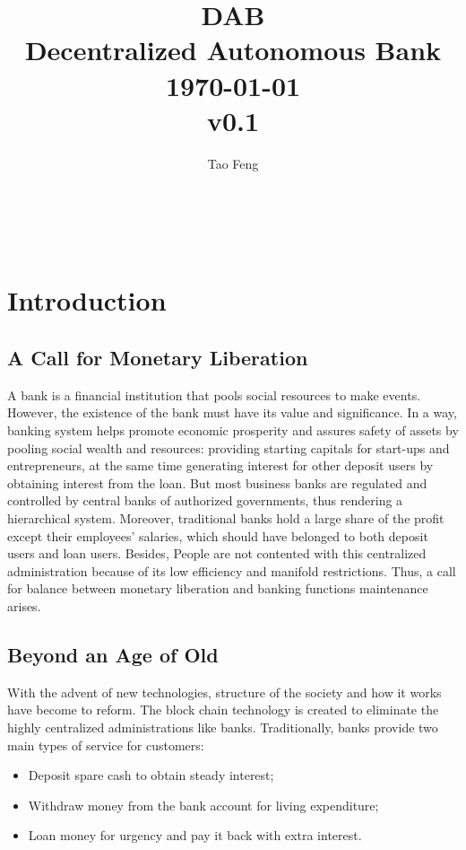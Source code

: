 \documentclass[a4paper, 10pt, conference]{ieeeconf} %
\title{\huge DAB\\[0.5em] \large Decentralized Autonomous Bank\\[1em]\today \\[1em] v0.1 }
\author{Tao Feng\\ \href{}{}  
\and \\ \href{}{}
\and \\ \href{}{} 
}
\begin{document}
\maketitle

\begin{abstract}

\end{abstract}



\tableofcontents
\thispagestyle{plain} %
\pagestyle{plain} %

\section{Introduction}
\subsection{A Call for Monetary Liberation}
A bank is a financial institution that pools social resources to make events. However, the existence of the bank must have its value and significance. In a way, banking system helps promote economic prosperity and assures safety of assets by pooling social wealth and resources: providing starting capitals for start-ups and entrepreneurs, at the same time generating interest for other deposit users by obtaining interest from the loan. But most business banks are regulated and controlled by central banks of authorized governments, thus rendering a hierarchical system. Moreover, traditional banks hold a large share of the profit except their employees' salaries, which should have belonged to both deposit users and loan users. Besides, People are not contented with this centralized administration because of its low efficiency and manifold restrictions. Thus, a call for balance between monetary liberation and banking functions maintenance arises.
\subsection{Beyond an Age of Old}
With the advent of new technologies, structure of the society and how it works have become to reform. The block chain technology is created to eliminate the highly centralized administrations like banks. Traditionally, banks provide two main types of service for customers:

\begin{itemize} 
   \item Deposit spare cash to obtain steady interest;\label{}
   \item Withdraw money from the bank account for living expenditure;\label{}
   \item Loan money for urgency and pay it back with extra interest.\label{}
\end{itemize}
\end{document}
